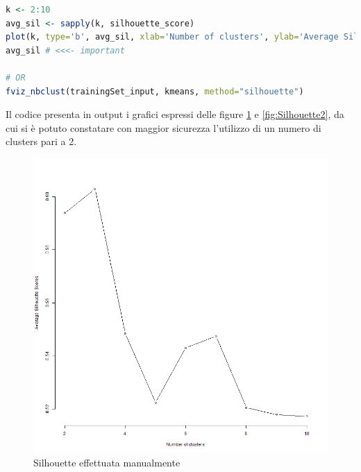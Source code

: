 \documentclass[letterpaper,11pt]{article}
\begin{document}
\begin{lstlisting}[language=R]
k <- 2:10
avg_sil <- sapply(k, silhouette_score)
plot(k, type='b', avg_sil, xlab='Number of clusters', ylab='Average Silhouette Scores', frame=FALSE)
avg_sil # <<<- important

# OR
fviz_nbclust(trainingSet_input, kmeans, method="silhouette")
\end{lstlisting}
Il codice presenta in output i grafici espressi delle figure \ref{fig:Silhouette1} e \ref{fig:Silhouette2}, da cui si è potuto constatare con maggior sicurezza l'utilizzo di un numero di clusters pari a 2. 
\begin{figure}[!htb]
   \begin{minipage}{0.48\textwidth}
     \centering
     \includegraphics[width=1\linewidth]{Img/K-MEANS/KMEANS003.png}
     \caption{Silhouette effettuata manualmente}\label{fig:Silhouette1}
   \end{minipage}\hfill
   \begin{minipage}{0.48\textwidth}
     \centering

\end{minipage}
\end{figure}
\end{document}
